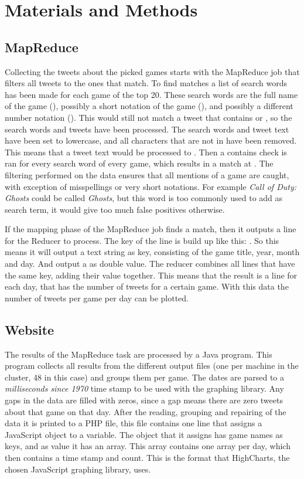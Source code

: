 \section{Materials and Methods}
\subsection{MapReduce}
Collecting the tweets about the picked games starts with the MapReduce job that filters all tweets to the ones that match. To find matches a list of search words has been made for each game of the top 20. These search words are the full name of the game (), possibly a short notation of the game (), and possibly a different number notation (). This would still not match a tweet that contains  or , so the search words and tweets have been processed. The search words and tweet text have been set to lowercase, and all characters that are not in  have been removed. This means that a tweet text  would be processed to . Then a contains check is ran for every search word of every game, which results in a match at . The filtering performed on the data ensures that all mentions of a game are caught, with exception of misspellings or very short notations. For example \emph{Call of Duty: Ghosts} could be called \emph{Ghosts}, but this word is too commonly used to add as search term, it would give too much false positives otherwise.

If the mapping phase of the MapReduce job finds a match, then it outputs a line for the Reducer to process. The key of the line is build up like this: . So this means it will output a text string as key, consisting of the game title, year, month and day. And output a  as double value. The reducer combines all lines that have the same key, adding their value together. This means that the result is a line for each day, that has the number of tweets for a certain game. With this data the number of tweets per game per day can be plotted.

\subsection{Website}
The results of the MapReduce task are processed by a Java program. This program collects all results from the different output files (one per machine in the cluster, 48 in this case) and groups them per game. The dates are parsed to a \emph{milliseconds since 1970} time stamp to be used with the graphing library. Any gaps in the data are filled with zeros, since a gap means there are zero tweets about that game on that day. After the reading, grouping and repairing of the data it is printed to a PHP file, this file contains one line that assigns a JavaScript object to a variable. The object that it assigns has game names as keys, and as value it has an array. This array contains one array per day, which then contains a time stamp and count. This is the format that HighCharts, the chosen JavaScript graphing library, uses.

